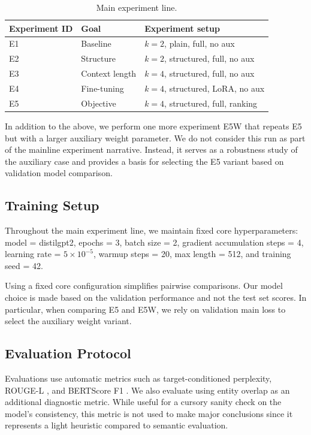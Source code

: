 \documentclass{article}
\newcommand{\model}{\mbox{\normalfont distilgpt2}}
\newcommand{\expid}[1]{\textsc{#1}}
\begin{document}
\begin{table}[t]
\caption{Main experiment line.}
\label{tab:matrix}
\centering
\scriptsize
\begin{tabular}{lll}
\toprule
Experiment ID & Goal & Experiment setup \\
\midrule
\expid{E1} & Baseline & $k=2$, plain, full, no aux \\
\expid{E2} & Structure & $k=2$, structured, full, no aux \\
\expid{E3} & Context length & $k=4$, structured, full, no aux \\
\expid{E4} & Fine-tuning & $k=4$, structured, LoRA, no aux \\
\expid{E5} & Objective & $k=4$, structured, full, ranking \\
\bottomrule
\end{tabular}
\end{table}

In addition to the above, we perform one more experiment \expid{E5W} that repeats \expid{E5} but with a larger auxiliary weight parameter. We do not consider this run as part of the mainline experiment narrative. Instead, it serves as a robustness study of the auxiliary case and provides a basis for selecting the \expid{E5} variant based on validation model comparison.

\subsection{Training Setup}

Throughout the main experiment line, we maintain fixed core hyperparameters: model = \model{}, epochs = 3, batch size = 2, gradient accumulation steps = 4, learning rate = $5 \times 10^{-5}$, warmup steps = 20, max length = 512, and training seed = 42.

Using a fixed core configuration simplifies pairwise comparisons. Our model choice is made based on the validation performance and not the test set scores. In particular, when comparing \expid{E5} and \expid{E5W}, we rely on validation main loss to select the auxiliary weight variant.

\subsection{Evaluation Protocol}

Evaluations use automatic metrics such as target-conditioned perplexity, ROUGE-L \citep{lin2004rouge}, and BERTScore F1 \citep{zhang2020bertscore}. We also evaluate using entity overlap as an additional diagnostic metric. While useful for a cursory sanity check on the model's consistency, this metric is not used to make major conclusions since it represents a light heuristic compared to semantic evaluation.
\end{document}

